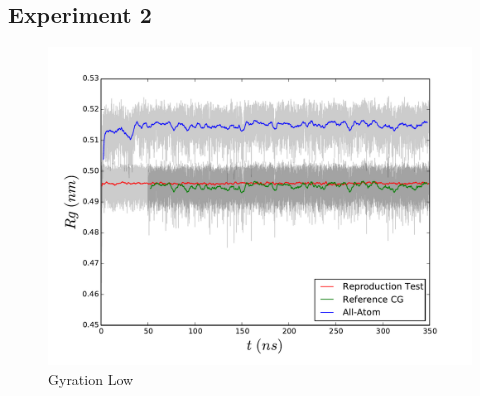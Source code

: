 \documentclass[10pt,a4paper,twoside]{article}
\begin{document}
\subsection{Experiment 2}
\label{subsec:resexp2}

	   \begin{figure}
  \begin{center}
		\includegraphics[width=0.8 \textwidth]{./graphs/GyraL}
	\caption{Gyration Low}
	\label{gfx:gyrLow}
	\end{center}
	\end{figure}
\end{document}
